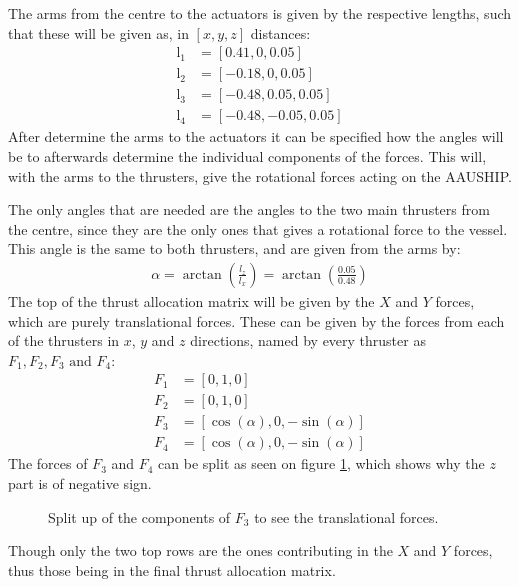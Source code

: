 The arms from the centre to the actuators is given by the respective lengths, such that these will be given as, in $[x, y, z]$ distances:
\begin{align}
\text{l}_1 &= [0.41, 0, 0.05]\\
\text{l}_2 &= [-0.18, 0, 0.05]\\
\text{l}_3 &= [-0.48, 0.05, 0.05]\\
\text{l}_4 &= [-0.48, -0.05, 0.05]
\end{align}
After determine the arms to the actuators it can be specified how the angles will be to afterwards determine the individual components of the forces. This will, with the arms to the thrusters, give the rotational forces acting on the AAUSHIP.

The only angles that are needed are the angles to the two main thrusters from the centre, since they are the only ones that gives a rotational force to the vessel. This angle is the same to both thrusters, and are given from the arms by:
\begin{align}
\alpha = \arctan\left(\frac{l_z}{l_x}\right) = \arctan\left(\frac{0.05}{0.48}\right)
\end{align}
The top of the thrust allocation matrix will be given by the $X$ and $Y$ forces, which are purely translational forces. These can be given by the forces from each of the thrusters in $x$, $y$ and $z$ directions, named by every thruster as $F_1, F_2, F_3 \text{ and } F_4$:
\begin{align}
F_1 &= [0, 1, 0] \\
F_2 &= [0, 1, 0] \\
F_3 &= [\cos(\alpha), 0, -\sin(\alpha)] \\
F_4 &= [\cos(\alpha), 0, -\sin(\alpha)] 
\end{align}
The forces of $F_3$ and $F_4$ can be split as seen on figure \ref{fig:f3vector}, which shows why the $z$ part is of negative sign.
\begin{figure}[htbp]
	\centering
	
	\caption{Split up of the components of $F_3$ to see the translational forces.}
	\label{fig:f3vector}
\end{figure}
Though only the two top rows are the ones contributing in the $X$ and $Y$ forces, thus those being in the final thrust allocation matrix.


